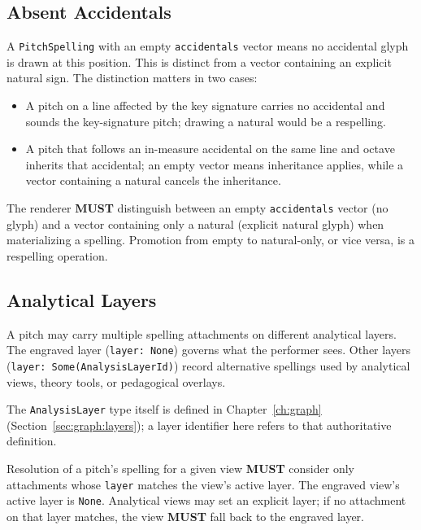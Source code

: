 \documentclass[11pt,letterpaper]{report}
\newcounter{requirement}[chapter]
\newcommand{\MUST}{\textbf{MUST}}
\begin{document}
\subsection{Absent Accidentals}
\label{sec:pitch:absent-accidental}

A \texttt{PitchSpelling} with an empty \texttt{accidentals} vector
means no accidental glyph is drawn at this position. This is distinct
from a vector containing an explicit natural sign. The distinction
matters in two cases:

\begin{itemize}
  \item A pitch on a line affected by the key signature carries no
    accidental and sounds the key-signature pitch; drawing a natural
    would be a respelling.
  \item A pitch that follows an in-measure accidental on the same line
    and octave inherits that accidental; an empty vector means
    inheritance applies, while a vector containing a natural cancels
    the inheritance.
\end{itemize}

\begin{requirement}
  \label{req:pitch:absent-versus-natural}
  The renderer \MUST{} distinguish between an empty
  \texttt{accidentals} vector (no glyph) and a vector containing only
  a natural (explicit natural glyph) when materializing a spelling.
  Promotion from empty to natural-only, or vice versa, is a
  respelling operation.
\end{requirement}

\subsection{Analytical Layers}
\label{sec:pitch:layers}

A pitch may carry multiple spelling attachments on different analytical
layers. The engraved layer (\texttt{layer: None}) governs what the
performer sees. Other layers (\texttt{layer: Some(AnalysisLayerId)})
record alternative spellings used by analytical views, theory tools,
or pedagogical overlays.

The \texttt{AnalysisLayer} type itself is defined in
Chapter~\ref{ch:graph} (Section~\ref{sec:graph:layers}); a layer
identifier here refers to that authoritative definition.

\begin{requirement}
  \label{req:pitch:spelling-layer-fallback}
  Resolution of a pitch's spelling for a given view \MUST{} consider
  only attachments whose \texttt{layer} matches the view's active layer.
  The engraved view's active layer is \texttt{None}. Analytical views
  may set an explicit layer; if no attachment on that layer matches,
  the view \MUST{} fall back to the engraved layer.
\end{requirement}
\end{document}

